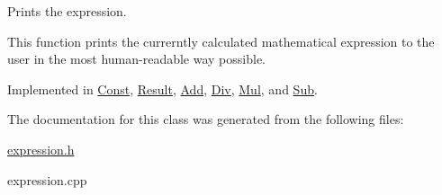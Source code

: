 Prints the expression. 

This function prints the currerntly calculated mathematical expression to the user in the most human-\/readable way possible. 

Implemented in \hyperlink{class_const_a81dc57c45d716e31d1cdb65a2c8f227d}{Const}, \hyperlink{class_result_a17227de791c97a6eee68689f4317cafa}{Result}, \hyperlink{class_add_ad5af4ca57a44efab928c58ef39b00df1}{Add}, \hyperlink{class_div_acbcc6e3d0f3ccb5e74de28de8499cbbf}{Div}, \hyperlink{class_mul_a0aa9276f2fc04dd9afc77bf47542e5ec}{Mul}, and \hyperlink{class_sub_a2e7c967c1fdee5e7eca51ca36feb26bc}{Sub}.



The documentation for this class was generated from the following files\+:\begin{DoxyCompactItemize}
\item 
\hyperlink{expression_8h}{expression.\+h}\item 
expression.\+cpp\end{DoxyCompactItemize}
